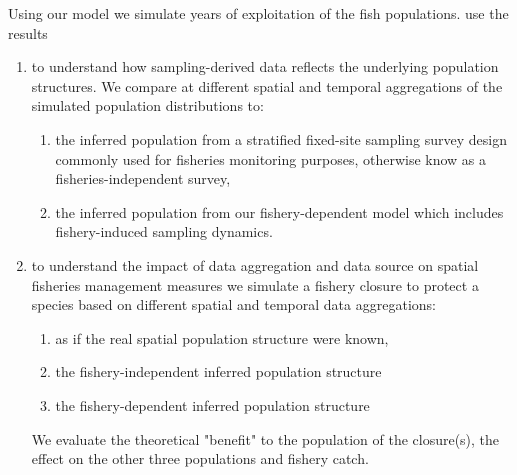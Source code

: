\documentclass[review]{elsarticle}
\begin{document}
Using our model we simulate  years of exploitation of
the fish populations.  use the
results

\begin{enumerate}
	\item to understand how sampling-derived data reflects the underlying
		population structures. We compare at different spatial and
		temporal aggregations of the simulated population distributions
		to: 
		\begin{enumerate}
			\item the inferred population from a stratified
				fixed-site sampling survey design commonly used
				for fisheries monitoring purposes, otherwise
				know as a fisheries-independent survey,
			\item the inferred population from our
				fishery-dependent model which includes
				fishery-induced sampling dynamics.\\
		\end{enumerate}
	\item to understand the impact of data aggregation and data source on
		spatial fisheries management measures we simulate a fishery
		closure to protect a species based on different spatial and
		temporal data aggregations:
		\begin{enumerate}
			\item as if the real spatial population structure were
				known,
			\item the fishery-independent inferred population
				structure
			\item the fishery-dependent inferred population
				structure
		\end{enumerate}
		We evaluate the theoretical "benefit" to the population of the
		closure(s), the effect on the other three populations and
		fishery catch.\\
\end{enumerate}
\end{document}
